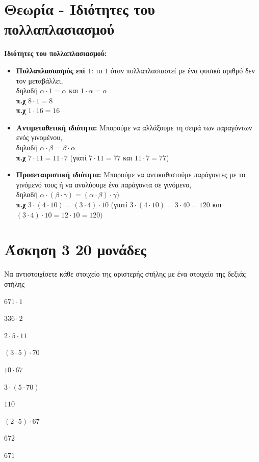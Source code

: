 \documentclass[a4paper,10pt]{report}
\begin{document}
\section*{Θεωρία - Ιδιότητες του πολλαπλασιασμού \hfill \small{}}
\textbf{Ιδιότητες του πολλαπλασιασμού:}
\begin{itemize}
 \item \textbf{Πολλαπλασιασμός επί $1$}: το $1$ όταν πολλαπλασιαστεί με ένα φυσικό αριθμό δεν τον μεταβάλλει,\\
        δηλαδή $α\cdot 1=α$ και $1\cdot α=α$\\
        \textbf{π.χ} $8\cdot1=8$\\
        \textbf{π.χ} $1\cdot16=16$
 \item \textbf{Αντιμεταθετική ιδιότητα: } Μπορούμε να αλλάξουμε τη σειρά των παραγόντων ενός γινομένου,\\
        δηλαδή $α\cdot β=β\cdot α$\\
       \textbf{π.χ} $7\cdot 11=11\cdot 7$ (γιατί $7\cdot11=77$ και $11\cdot 7=77$)
 \item \textbf{Προσεταιριστική ιδιότητα:} Μπορούμε να αντικαθιστούμε παράγοντες με το γινόμενό τους ή να αναλύουμε 
       ένα παράγοντα σε γινόμενο,\\
       δηλαδή $α\cdot (β\cdot γ)=(α\cdot β) \cdot γ)$\\
       \textbf{π.χ} $3\cdot (4\cdot 10)=(3\cdot 4)\cdot 10$ (γιατί $3\cdot(4\cdot10)=3\cdot40=120$ και 
                                                            $(3\cdot4)\cdot10=12\cdot10=120)$
\end{itemize}


\section*{Άσκηση 3  \hfill \small{}20  μονάδες}
Να αντιστοιχίσετε κάθε στοιχείο της αριστερής στήλης με ένα στοιχείο της δεξιάς στήλης
\begin{itemize}
\begin{multicols}{2}
 \item $671\cdot1$
 \item $336\cdot2$
 \item $2\cdot5\cdot11$
 \item $(3\cdot5)\cdot70$
 \item $10\cdot67$
 \item $3\cdot(5\cdot70)$
 \item $110$
 \item $(2\cdot5)\cdot67$
 \item $672$
 \item $671$
\end{multicols}
\end{itemize}
\end{document}

